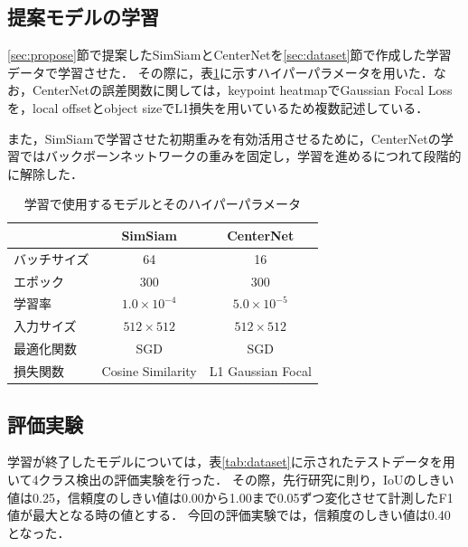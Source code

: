 \documentclass[a4j,8pt,twocolumn]{extarticle}
\begin{document}
        \subsection{提案モデルの学習}
            \label{sec:train}
            \ref{sec:propose}節で提案したSimSiamとCenterNetを\ref{sec:dataset}節で作成した学習データで学習させた．
            その際に，表\ref{tab:param}に示すハイパーパラメータを用いた．なお，CenterNetの誤差関数に関しては，keypoint heatmapでGaussian Focal Lossを，local offsetとobject sizeでL1損失を用いているため複数記述している．

            また，SimSiamで学習させた初期重みを有効活用させるために，CenterNetの学習ではバックボーンネットワークの重みを固定し，学習を進めるにつれて段階的に解除した．

            \begin{table}[!t]
                \centering
                \caption{学習で使用するモデルとそのハイパーパラメータ}
                \label{tab:param}
                    \begin{tabular}{l|cc} \hline
                        & SimSiam & CenterNet \\ \hline
                        バッチサイズ &  64 &  16 \\
                        エポック &  300 &  300 \\
                        学習率 & $1.0 \times 10^{-4}$ & $5.0 \times 10^{-5}$ \\
                        入力サイズ & $512 \times 512$ & $512 \times 512$ \\
                        最適化関数 & SGD & SGD \\
                        損失関数 & Cosine Similarity & L1 Gaussian Focal \\ \hline
                    \end{tabular}
            \end{table}

            \subsection{評価実験}
                \label{sec:eval}
                学習が終了したモデルについては，表\ref{tab:dataset}に示されたテストデータを用いて4クラス検出の評価実験を行った．
                その際，先行研究に則り，IoUのしきい値は0.25，信頼度のしきい値は0.00から1.00まで0.05ずつ変化させて計測したF1値が最大となる時の値とする．
                今回の評価実験では，信頼度のしきい値は0.40となった．
\end{document}
